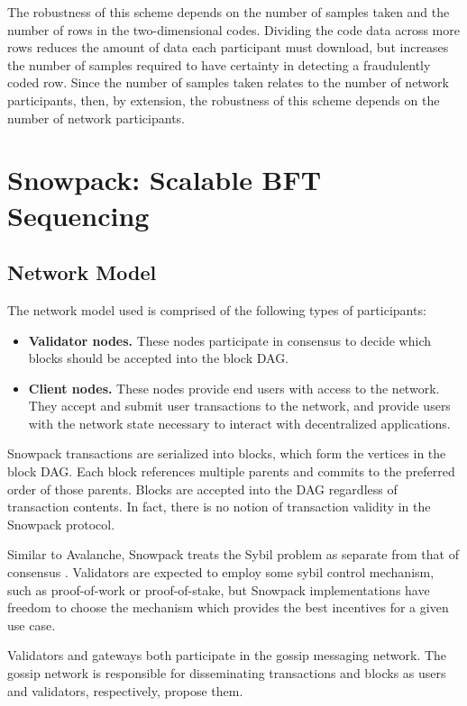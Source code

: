 \documentclass[12pt]{article}
\begin{document}
  The robustness of this scheme depends on the number of samples taken and the
  number of rows in the two-dimensional codes. Dividing the code data across
  more rows reduces the amount of data each participant must download, but
  increases the number of samples required to have certainty in detecting a
  fraudulently coded row. Since the number of samples taken relates to the
  number of network participants, then, by extension, the robustness of this
  scheme depends on the number of network participants.

\section{Snowpack: Scalable BFT Sequencing}
\subsection{Network Model}
  The network model used is comprised of the following types of participants:

  \begin{itemize}
    \item \textbf{Validator nodes.} These nodes participate in consensus to
      decide which blocks should be accepted into the block DAG.
    \item \textbf{Client nodes.} These nodes provide end users with access to
      the network. They accept and submit user transactions to the network, and
      provide users with the network state necessary to interact with
      decentralized applications.
  \end{itemize}

  Snowpack transactions are serialized into blocks, which form the vertices in
  the block DAG. Each block references multiple parents and commits to the
  preferred order of those parents. Blocks are accepted into the DAG regardless
  of transaction contents. In fact, there is no notion of transaction validity
  in the Snowpack protocol.

  Similar to Avalanche, Snowpack treats the Sybil problem as separate from that
  of consensus \cite{rocket}. Validators are expected to employ some sybil
  control mechanism, such as proof-of-work or proof-of-stake, but Snowpack
  implementations have freedom to choose the mechanism which provides the best
  incentives for a given use case.

  Validators and gateways both participate in the gossip messaging network. The
  gossip network is responsible for disseminating transactions and blocks as
  users and validators, respectively, propose them.
\end{document}
